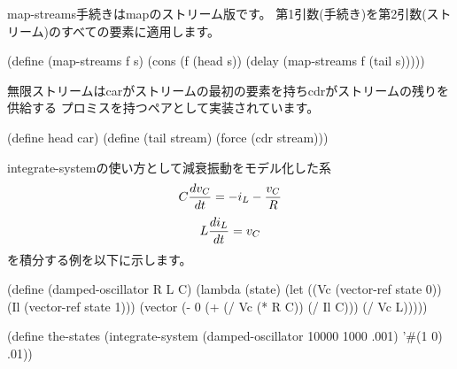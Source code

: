 {\cf map-streams}手続きは{\cf map}のストリーム版です。
第1引数(手続き)を第2引数(ストリーム)のすべての要素に適用します。

\begin{schemenoindent}
(define (map-streams f s)
  (cons (f (head s))
        (delay (map-streams f (tail s)))))%
\end{schemenoindent}

無限ストリームはcarがストリームの最初の要素を持ちcdrがストリームの残りを供給する
プロミスを持つペアとして実装されています。

\begin{schemenoindent}
(define head car)
(define (tail stream)
  (force (cdr stream)))%
\end{schemenoindent}

\bigskip
{\cf integrate-system}の使い方として減衰振動をモデル化した系
$$ C {dv_C \over dt} = -i_L - {v_C \over R}$$\nobreak
$$ L {di_L \over dt} = v_C$$
を積分する例を以下に示します。

\begin{schemenoindent}
(define (damped-oscillator R L C)
  (lambda (state)
    (let ((Vc (vector-ref state 0))
          (Il (vector-ref state 1)))
      (vector (- 0 (+ (/ Vc (* R C)) (/ Il C)))
              (/ Vc L)))))

(define the-states
  (integrate-system
     (damped-oscillator 10000 1000 .001)
     '\#(1 0)
     .01))%
\end{schemenoindent}

